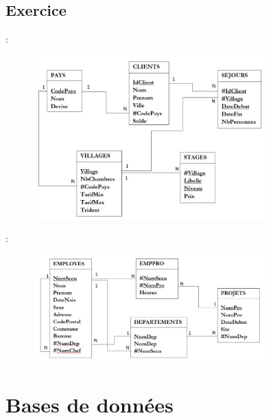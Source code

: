 \documentclass[10pt]{beamer}
\begin{document}
\subsection{Exercice}
\begin{frame}{\secname : \subsecname}
    \begin{figure}
        \begin{center}
            \includegraphics[width=0.8\textwidth]{../assets/img/pays-exercice.pdf}
            \label{Fig:pays-exercice}
        \end{center}
    \end{figure}
\end{frame}
\begin{frame}{\secname : \subsecname}
    \begin{figure}
        \begin{center}
            \includegraphics[width=0.8\textwidth]{../assets/img/employes-exercice.pdf}
            \label{Fig:employes-exercice}
        \end{center}
    \end{figure}
\end{frame}

\section{Bases de données}
\tocss
\end{document}
